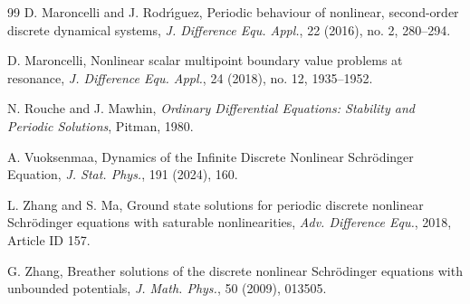 \documentclass[12 pt,twoside]{amsart}
\numberwithin{equation}{section}
\theoremstyle{definition}
\theoremstyle{remark}
\begin{document}
\begin{thebibliography}{99}
D. Maroncelli and J. Rodr\'{\i}guez,
Periodic behaviour of nonlinear, second-order discrete dynamical systems,
\emph{J. Difference Equ. Appl.}, 22 (2016), no. 2, 280--294.

D. Maroncelli,
Nonlinear scalar multipoint boundary value problems at resonance,
\emph{J. Difference Equ. Appl.}, 24 (2018), no. 12, 1935--1952.

N. Rouche and J. Mawhin,
\emph{Ordinary Differential Equations: Stability and Periodic Solutions},
Pitman, 1980.

A. Vuoksenmaa,
Dynamics of the Infinite Discrete Nonlinear Schr\"odinger Equation,
\emph{J. Stat. Phys.}, 191 (2024), 160.

L. Zhang and S. Ma,
Ground state solutions for periodic discrete nonlinear Schr\"odinger equations with saturable nonlinearities,
\emph{Adv. Difference Equ.}, 2018, Article ID 157.

G. Zhang,
Breather solutions of the discrete nonlinear Schr\"odinger equations with unbounded potentials,
\emph{J. Math. Phys.}, 50 (2009), 013505.


\end{thebibliography}
\end{document}
